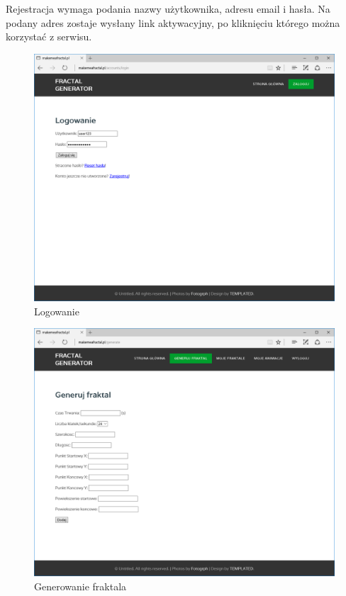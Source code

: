 \documentclass[a4paper]{article}
\begin{document}
Rejestracja wymaga podania nazwy użytkownika, adresu email i hasła. Na podany adres zostaje wysłany link aktywacyjny, po kliknięciu którego można korzystać z serwisu.
\begin{figure}[H]
    \centering
    \includegraphics[width=\textwidth]{login_page.png}
    \caption{Logowanie}
    \label{fig:activ_page}
\end{figure}
\begin{figure}[H]
    \centering
    \includegraphics[width=\textwidth]{gen_page.png}
    \caption{Generowanie fraktala}
    \label{fig:gen_page}
\end{figure}
\end{document}

